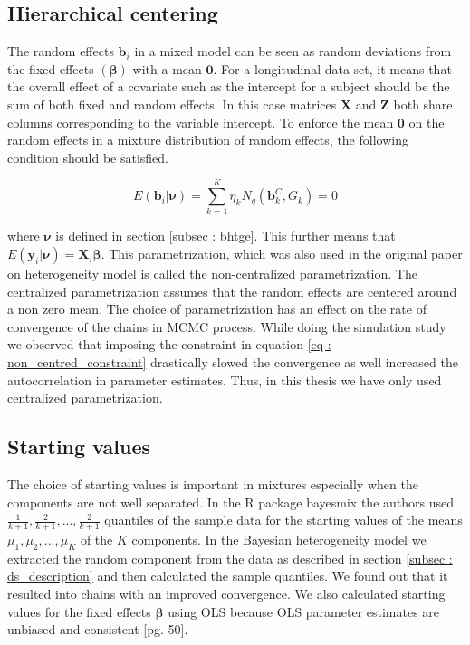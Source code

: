 \subsection{Hierarchical centering}
The random effects $\boldsymbol{b}_i$ in a mixed model can be seen as random deviations from the fixed effects $(\boldsymbol{\beta})$ with a mean $\boldsymbol{0}$. For a longitudinal data set, it means that the overall effect of a covariate such as the intercept for a subject should be the sum of both fixed and random effects. In this case matrices $\boldsymbol{X}$ and $\boldsymbol{Z}$ both share columns corresponding to the variable intercept. To enforce the mean $\boldsymbol{0}$ on the random effects in a mixture distribution of random effects, the following condition should be satisfied.

\begin{equation}
\label{eq : non_centred_constraint}
E(\boldsymbol{b}_i | \boldsymbol{\nu}) = \sum_{k=1}^{K} \eta_k N_q(\boldsymbol{b}_k^C, G_k) = 0
\end{equation}

where $\boldsymbol{\nu}$ is defined in section \ref{subsec : bhtge}. This further means that $E(\boldsymbol{y}_i | \boldsymbol{\nu}) = \boldsymbol{X}_{i}\boldsymbol{\beta}$. This parametrization, which was also used in the original paper on heterogeneity model \citep{verbeke_linear_1996} is called the non-centralized parametrization. The centralized parametrization assumes that the random effects are centered around a non zero mean. The choice of parametrization has an effect on the rate of convergence of the chains in MCMC process. While doing the simulation study we observed that imposing the constraint in equation \ref{eq : non_centred_constraint} drastically slowed the convergence as well increased the autocorrelation in parameter estimates. Thus, in this thesis we have only used centralized parametrization.

\subsection{Starting values}
\label{subsec : choice_starting_values}
The choice of starting values is important in mixtures especially when the components are not well separated. In the R package bayesmix \citep{gruen_bayesmix:_2015} the authors used $\frac 1 {k+1}, \frac 2 {k+1}, ..., \frac 2 {k+1}$ quantiles of the sample data for the starting values of the means $\mu_1, \mu_2, ..., \mu_K$ of the $K$ components. In the Bayesian heterogeneity model we extracted the random component from the data as described in section \ref{subsec : ds_description} and then calculated the sample quantiles. We found out that it resulted into chains with an improved convergence. We also calculated starting values for the fixed effects $\boldsymbol{\beta}$ using OLS because OLS parameter estimates are unbiased and consistent [pg. 50]\citep{verbeke_linear_2009}.

